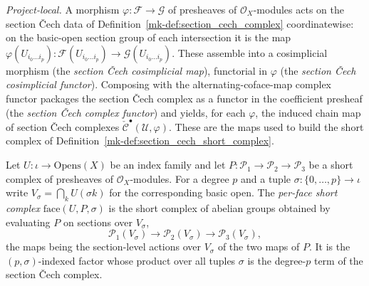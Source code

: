 \begin{definition}
  \label{mk-def:section_cech_functoriality}

  \textit{Project-local.}
  A morphism \(\varphi : \mathcal{F} \to \mathcal{G}\) of presheaves of \(\mathcal{O}_X\)-modules
  acts on the section {\v C}ech data of Definition~\ref{mk-def:section_cech_complex} coordinatewise:
  on the basic-open section group of each intersection it is the map
  \(\varphi(U_{i_0 \ldots i_p}) : \mathcal{F}(U_{i_0 \ldots i_p}) \to \mathcal{G}(U_{i_0 \ldots
  i_p})\). These assemble into a cosimplicial morphism (the \emph{section {\v C}ech cosimplicial
  map}), functorial in \(\varphi\) (the \emph{section {\v C}ech cosimplicial functor}). Composing
  with the alternating-coface-map complex functor packages the section {\v C}ech complex as a
  functor in the coefficient presheaf (the \emph{section {\v C}ech complex functor}) and yields,
  for each \(\varphi\), the induced chain map of section {\v C}ech complexes
  \(\check{\mathcal{C}}^\bullet(\mathcal{U}, \varphi)\). These are the maps used to build the short
  complex of Definition~\ref{mk-def:section_cech_short_complex}.
\end{definition}

\begin{definition}\label{mk-def:face_short_complex}
  \leanok

  Let \(U : \iota \to \mathrm{Opens}(X)\) be an index family and let
  \(P : \mathcal{P}_1 \to \mathcal{P}_2 \to \mathcal{P}_3\) be a short complex of presheaves of
  \(\mathcal{O}_X\)-modules. For a degree \(p\) and a tuple \(\sigma : \{0, \ldots, p\} \to \iota\)
  write \(V_\sigma = \bigcap_k U(\sigma k)\) for the corresponding basic open. The \emph{per-face
  short complex} \(\mathrm{face}(U, P, \sigma)\) is the short complex of abelian groups obtained by
  evaluating \(P\) on sections over \(V_\sigma\),
  \[
    \mathcal{P}_1(V_\sigma) \longrightarrow \mathcal{P}_2(V_\sigma) \longrightarrow
      \mathcal{P}_3(V_\sigma),
  \]
  the maps being the section-level actions over \(V_\sigma\) of the two maps of \(P\). It is the
  \((p, \sigma)\)-indexed factor whose product over all tuples \(\sigma\) is the degree-\(p\) term
  of the section {\v C}ech complex.
\end{definition}

